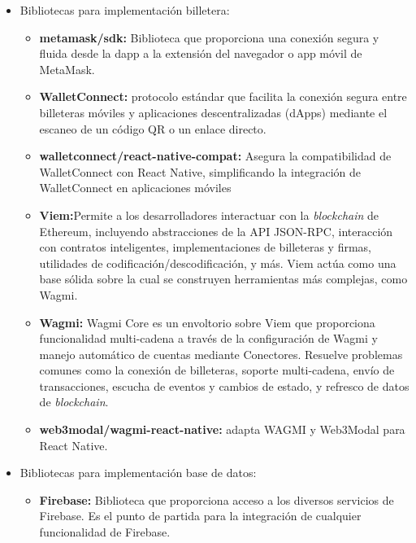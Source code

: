 \begin{itemize}
\begin{itemize}
\end{itemize}


\item Bibliotecas para implementación billetera:

\begin{itemize}

\item \textbf{metamask/sdk:} Biblioteca que proporciona una conexión segura y fluida desde la dapp a la extensión del navegador o app móvil de MetaMask. 

\item \textbf{WalletConnect:} protocolo estándar que facilita la conexión segura entre billeteras móviles y aplicaciones descentralizadas (dApps) mediante el escaneo de un código QR o un enlace directo.

\item \textbf{walletconnect/react-native-compat:} Asegura la compatibilidad de WalletConnect con React Native, simplificando la integración de WalletConnect en aplicaciones móviles

\item \textbf{Viem:}Permite a los desarrolladores interactuar con la \textit{blockchain} de Ethereum, incluyendo abstracciones de la API JSON-RPC, interacción con contratos inteligentes, implementaciones de billeteras y firmas, utilidades de codificación/descodificación, y más. Viem actúa como una base sólida sobre la cual se construyen herramientas más complejas, como Wagmi.

\item \textbf{Wagmi:} Wagmi Core es un envoltorio sobre Viem que proporciona funcionalidad multi-cadena a través de la configuración de Wagmi y manejo automático de cuentas mediante Conectores. Resuelve problemas comunes como la conexión de billeteras, soporte multi-cadena, envío de transacciones, escucha de eventos y cambios de estado, y refresco de datos de \textit{blockchain}.

\item \textbf{web3modal/wagmi-react-native:} adapta WAGMI y Web3Modal para React Native.

\end{itemize}


\item Bibliotecas para implementación base de datos:

\begin{itemize}

\item \textbf{Firebase:} Biblioteca que proporciona acceso a los diversos servicios de Firebase. Es el punto de partida para la integración de cualquier funcionalidad de Firebase.


\end{itemize}
\end{itemize}
